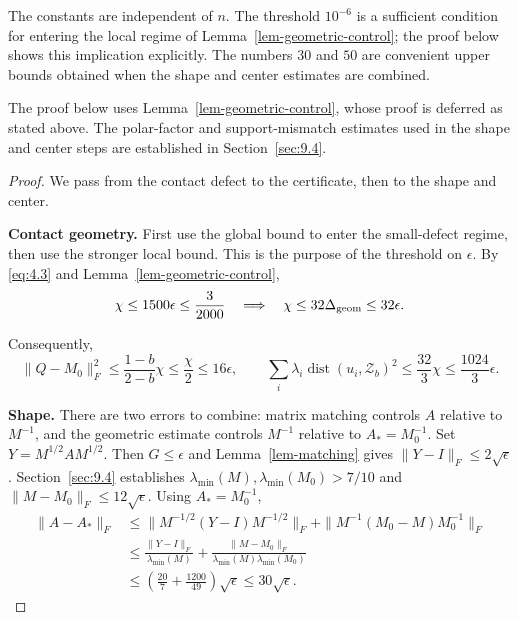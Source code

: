 The constants are independent of $n$. The threshold $10^{-6}$ is a sufficient
condition for entering the local regime of Lemma~\ref{lem-geometric-control}; the proof below shows
this implication explicitly. The numbers $30$ and $50$ are convenient upper
bounds obtained when the shape and center estimates are combined.

The proof below uses Lemma~\ref{lem-geometric-control}, whose proof is deferred as stated above.
The polar-factor and support-mismatch estimates used in the shape and center
steps are established in Section~\ref{sec:9.4}.

\begin{proof}
We pass from the contact defect to the certificate, then to the shape and center.

\textbf{Contact geometry.} First use the global bound to enter the small-defect
regime, then use the stronger local bound. This is the purpose of the
threshold on $\epsilon$. By \eqref{eq:4.3} and Lemma~\ref{lem-geometric-control},
\begin{equation}\label{eq:6.3}
\chi\le1500\epsilon\le\frac3{2000}
\quad\Longrightarrow\quad
\chi\le32\Delta_{\rm geom}\le32\epsilon.
\end{equation}

Consequently,
\begin{equation}\label{eq:6.4}
\|Q-M_0\|_F^2\le\frac{1-b}{2-b}\chi\le\frac\chi2\le16\epsilon,
\qquad
\sum_i\lambda_i\operatorname{dist}(u_i,\mathcal Z_b)^2
\le\frac{32}{3}\chi\le\frac{1024}{3}\epsilon.
\end{equation}

\textbf{Shape.} There are two errors to combine: matrix matching controls $A$ relative
to $M^{-1}$, and the geometric estimate controls $M^{-1}$ relative to
$A_*=M_0^{-1}$. Set $Y=M^{1/2}AM^{1/2}$.
Then $G\le\epsilon$ and Lemma~\ref{lem-matching} gives $\|Y-I\|_F\le2\sqrt\epsilon$. Section~\ref{sec:9.4} establishes
$\lambda_{\min}(M),\lambda_{\min}(M_0)>7/10$ and
$\|M-M_0\|_F\le12\sqrt\epsilon$. Using $A_*=M_0^{-1}$,
\begin{equation}\label{eq:6.5}
\begin{aligned}
\|A-A_*\|_F
&\le\|M^{-1/2}(Y-I)M^{-1/2}\|_F
+\|M^{-1}(M_0-M)M_0^{-1}\|_F\\
&\le\frac{\|Y-I\|_F}{\lambda_{\min}(M)}
+\frac{\|M-M_0\|_F}{\lambda_{\min}(M)\lambda_{\min}(M_0)}\\
&\le\left(\frac{20}{7}+\frac{1200}{49}\right)\sqrt\epsilon
\le30\sqrt\epsilon.
\end{aligned}
\end{equation}


\end{proof}
